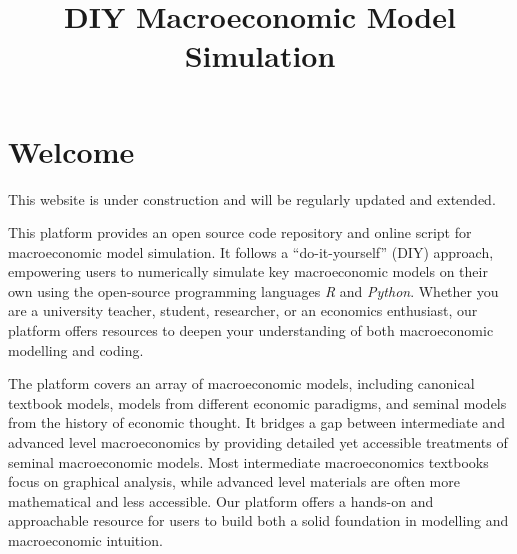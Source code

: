 \documentclass[
  letterpaper,
  DIV=11,
  numbers=noendperiod]{scrreprt}
\title{DIY Macroeconomic Model Simulation}
\author{}
\date{}
\renewcommand*\contentsname{Table of contents}
\newcommand\contentsname{Table of contents}
\begin{document}
\maketitle

\renewcommand*\contentsname{Table of contents}
{
\hypersetup{linkcolor=}
\setcounter{tocdepth}{2}
\tableofcontents
}

\chapter*{Welcome}\label{welcome}


\begin{tcolorbox}[enhanced jigsaw, titlerule=0mm, breakable, bottomrule=.15mm, toprule=.15mm, colbacktitle=quarto-callout-warning-color!10!white, rightrule=.15mm, toptitle=1mm, opacityback=0, left=2mm, coltitle=black, title=\textcolor{quarto-callout-warning-color}{\faExclamationTriangle}\hspace{0.5em}{Warning}, colframe=quarto-callout-warning-color-frame, opacitybacktitle=0.6, leftrule=.75mm, bottomtitle=1mm, arc=.35mm, colback=white]

This website is under construction and will be regularly updated and
extended.

\end{tcolorbox}

This platform provides an open source code repository and online script
for macroeconomic model simulation. It follows a ``do-it-yourself''
(DIY) approach, empowering users to numerically simulate key
macroeconomic models on their own using the open-source programming
languages \emph{R} and \emph{Python}. Whether you are a university
teacher, student, researcher, or an economics enthusiast, our platform
offers resources to deepen your understanding of both macroeconomic
modelling and coding.

The platform covers an array of macroeconomic models, including
canonical textbook models, models from different economic paradigms, and
seminal models from the history of economic thought. It bridges a gap
between intermediate and advanced level macroeconomics by providing
detailed yet accessible treatments of seminal macroeconomic models. Most
intermediate macroeconomics textbooks focus on graphical analysis, while
advanced level materials are often more mathematical and less
accessible. Our platform offers a hands-on and approachable resource for
users to build both a solid foundation in modelling and macroeconomic
intuition.
\end{document}
